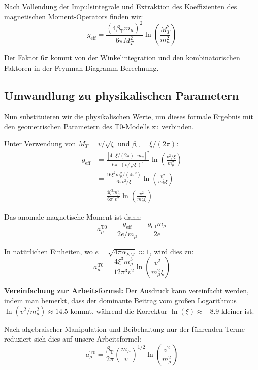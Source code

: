 \documentclass[12pt,a4paper]{article}
\newcommand{\betaT}{\beta_{\text{T}}}
\newcommand{\xigeom}{\xi}
\begin{document}
	Nach Vollendung der Impulsintegrale und Extraktion des Koeffizienten des magnetischen Moment-Operators finden wir:
	\begin{equation}
		g_{\text{eff}} = \frac{(4\betaT m_\mu)^2}{6\pi M_T^2} \ln\left(\frac{M_T^2}{m_\mu^2}\right)
	\end{equation}
	
	Der Faktor $6\pi$ kommt von der Winkelintegration und den kombinatorischen Faktoren in der Feynman-Diagramm-Berechnung.
	
	\subsection{Umwandlung zu physikalischen Parametern}
	
	Nun substituieren wir die physikalischen Werte, um dieses formale Ergebnis mit den geometrischen Parametern des T0-Modells zu verbinden.
	
	Unter Verwendung von $M_T = v/\sqrt{\xigeom}$ und $\betaT = \xigeom/(2\pi)$:
	\begin{align}
		g_{\text{eff}} &= \frac{[4 \cdot \xigeom/(2\pi) \cdot m_\mu]^2}{6\pi \cdot (v/\sqrt{\xigeom})^2} \ln\left(\frac{v^2/\xigeom}{m_\mu^2}\right) \\
		&= \frac{16\xigeom^2 m_\mu^2/(4\pi^2)}{6\pi v^2/\xigeom} \ln\left(\frac{v^2}{m_\mu^2 \xigeom}\right) \\
		&= \frac{4\xigeom^3 m_\mu^2}{6\pi^3 v^2} \ln\left(\frac{v^2}{m_\mu^2 \xigeom}\right)
	\end{align}
	
	Das anomale magnetische Moment ist dann:
	\begin{equation}
		a_\mu^{\text{T0}} = \frac{g_{\text{eff}}}{2e/m_\mu} = \frac{g_{\text{eff}} m_\mu}{2e}
	\end{equation}
			


In natürlichen Einheiten, wo $e = \sqrt{4\pi\alpha_{EM}} \approx 1$, wird dies zu:
\begin{equation}
a_\mu^{\text{T0}} = \frac{4\xigeom^3 m_\mu^3}{12\pi^3 v^2} \ln\left(\frac{v^2}{m_\mu^2 \xigeom}\right)
\end{equation}

\textbf{Vereinfachung zur Arbeitsformel:} Der Ausdruck kann vereinfacht werden, indem man bemerkt, dass der dominante Beitrag vom großen Logarithmus $\ln(v^2/m_\mu^2) \approx 14.5$ kommt, während die Korrektur $\ln(\xigeom) \approx -8.9$ kleiner ist. 

Nach algebraischer Manipulation und Beibehaltung nur der führenden Terme reduziert sich dies auf unsere Arbeitsformel:
\begin{equation}
a_\mu^{\text{T0}} = \frac{\betaT}{2\pi} \left(\frac{m_\mu}{v}\right)^{1/2} \ln\left(\frac{v^2}{m_\mu^2}\right)
\end{equation}
\end{document}
